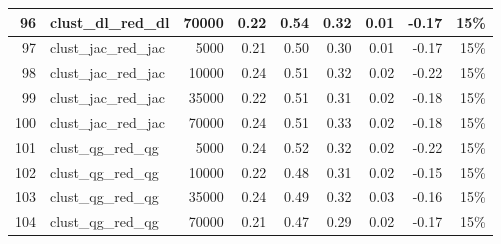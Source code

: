 \documentclass{praca1}
\begin{document}
\begin{table}[!h]
\begin{tabular}{|rlr|rrr|rr|r|}
  96 & clust\_dl\_red\_dl & 70000 & 0.22 & 0.54 & 0.32 & 0.01 & -0.17 & 15\% \\ 
   \hline
97 & clust\_jac\_red\_jac & 5000 & 0.21 & 0.50 & 0.30 & 0.01 & -0.17 & 15\% \\ 
  98 & clust\_jac\_red\_jac & 10000 & 0.24 & 0.51 & 0.32 & 0.02 & -0.22 & 15\% \\ 
  99 & clust\_jac\_red\_jac & 35000 & 0.22 & 0.51 & 0.31 & 0.02 & -0.18 & 15\% \\ 
  100 & clust\_jac\_red\_jac & 70000 & 0.24 & 0.51 & 0.33 & 0.02 & -0.18 & 15\% \\ 
   \hline
101 & clust\_qg\_red\_qg & 5000 & 0.24 & 0.52 & 0.32 & 0.02 & -0.22 & 15\% \\ 
  102 & clust\_qg\_red\_qg & 10000 & 0.22 & 0.48 & 0.31 & 0.02 & -0.15 & 15\% \\ 
  103 & clust\_qg\_red\_qg & 35000 & 0.24 & 0.49 & 0.32 & 0.03 & -0.16 & 15\% \\ 
  104 & clust\_qg\_red\_qg & 70000 & 0.21 & 0.47 & 0.29 & 0.02 & -0.17 & 15\% \\ 
   \hline
\end{tabular}
\end{table}
\end{document}

